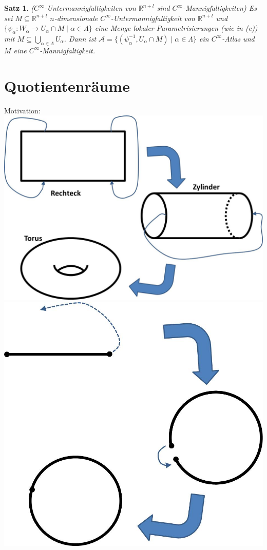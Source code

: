 \documentclass[a4paper,11pt,notitlepage]{report}
\newtheorem{theorem}{Satz}[chapter]
\theoremstyle{remark}
\theoremstyle{definition}
\newcommand{\R}{{\ensuremath{\mathbb{R}}}}
\begin{document}
\begin{theorem}{($C^\infty$-Untermannigfaltigkeiten von $\R^{n+l}$ sind $C^\infty$-Mannigfaltigkeiten)}
	Es sei $M \subseteq \R^{n+l}$ $n$-dimensionale $C^\infty$-Untermannigfaltigkeit von $\R^{n+l}$ und $\{\psi_\alpha \colon W_\alpha \rightarrow U_\alpha \cap M \mid \alpha \in \Lambda\}$ eine Menge lokaler Parametrisierungen (wie in (c)) mit $M \subseteq \bigcup\limits_{\alpha \in \Lambda}{U_\alpha}$.
	Dann ist $\mathcal{A} = \{(\psi_\alpha^{-1}, U_\alpha \cap M) \mid \alpha \in \Lambda\}$ ein $C^\infty$-Atlas und $M$ eine $C^\infty$-Mannigfaltigkeit.
\end{theorem}

\newpage
\section{Quotientenräume}
Motivation:\newline
\includegraphics[scale=0.6]{images/Identifizierung1.jpg}\newline
\includegraphics[scale=0.6]{images/Identifizierung2.jpg}\newline
\end{document}
